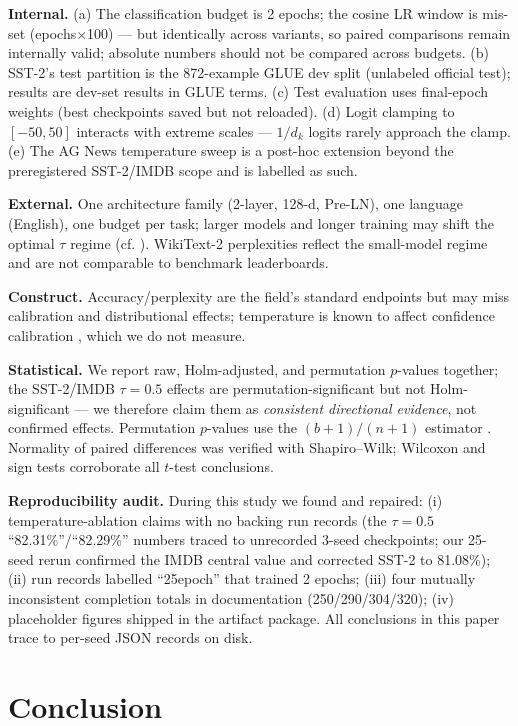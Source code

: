 \documentclass[11pt,a4paper]{article}
\begin{document}
\textbf{Internal.} (a) The classification budget is 2 epochs; the cosine LR window is mis-set (epochs$\times$100) --- but identically across variants, so paired comparisons remain internally valid; absolute numbers should not be compared across budgets. (b) SST-2's test partition is the 872-example GLUE dev split (unlabeled official test); results are dev-set results in GLUE terms. (c) Test evaluation uses final-epoch weights (best checkpoints saved but not reloaded). (d) Logit clamping to $[-50,50]$ interacts with extreme scales --- $1/d_k$ logits rarely approach the clamp. (e) The AG News temperature sweep is a post-hoc extension beyond the preregistered SST-2/IMDB scope and is labelled as such.

\textbf{External.} One architecture family (2-layer, 128-d, Pre-LN), one language (English), one budget per task; larger models and longer training may shift the optimal $\tau$ regime (cf. \cite{hoffmann2022}). WikiText-2 perplexities reflect the small-model regime and are not comparable to benchmark leaderboards.

\textbf{Construct.} Accuracy/perplexity are the field's standard endpoints but may miss calibration and distributional effects; temperature is known to affect confidence calibration \cite{guo2017}, which we do not measure.

\textbf{Statistical.} We report raw, Holm-adjusted, and permutation $p$-values together; the SST-2/IMDB $\tau{=}0.5$ effects are permutation-significant but not Holm-significant --- we therefore claim them as \emph{consistent directional evidence}, not confirmed effects. Permutation $p$-values use the $(b{+}1)/(n{+}1)$ estimator \cite{phipson2010}. Normality of paired differences was verified with Shapiro--Wilk; Wilcoxon and sign tests corroborate all $t$-test conclusions.

\textbf{Reproducibility audit.} During this study we found and repaired: (i) temperature-ablation claims with no backing run records (the $\tau{=}0.5$ ``82.31\%''/``82.29\%'' numbers traced to unrecorded 3-seed checkpoints; our 25-seed rerun confirmed the IMDB central value and corrected SST-2 to 81.08\%); (ii) run records labelled ``25epoch'' that trained 2 epochs; (iii) four mutually inconsistent completion totals in documentation (250/290/304/320); (iv) placeholder figures shipped in the artifact package. All conclusions in this paper trace to per-seed JSON records on disk.

\section{Conclusion}
\end{document}
